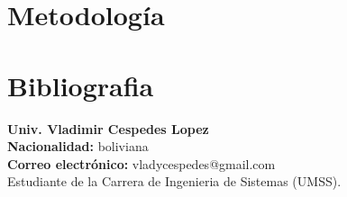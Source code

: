 \documentclass[letter,11pt,oneside,spanish]{article}
\begin{document}
\section{Metodología}

\section{Bibliografia}


%

\newpage


\textbf{Univ. Vladimir Cespedes Lopez}\\
\textbf{Nacionalidad:} boliviana\\
\textbf{Correo electrónico:} vladycespedes@gmail.com\\
Estudiante de la Carrera de Ingenieria de Sistemas (UMSS).\\
\end{document}
